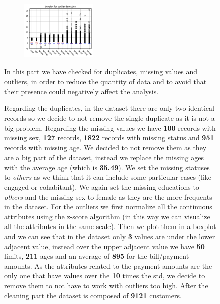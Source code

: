\begin{figure}[h]
  \begin{minipage}[h]{0.95\textwidth}

\begin{figure}
\centering
\includegraphics[width=0.40\textwidth]{img/ch2/outlier}
\end{figure}

    In this part we have checked for duplicates, missing values and outliers, in order to reduce the quantity of data and to avoid that their presence could negatively affect the analysis.

    Regarding the duplicates, in the dataset there are only two identical records so we decide to not remove the single duplicate as it is not a big problem.
    Regarding the missing values we have \textbf{100} records with missing sex, \textbf{127} records, \textbf{1822} records with missing status and \textbf{951} records with missing age. We decided to not remove them as they are a big part of the dataset, instead we replace the missing ages with the average age (which is \textbf{35.49}). We set the missing statuses to \textit{others} as we think that it can include some particular cases (like engaged or cohabitant). We again set the missing educations to \textit{others} and the missing sex to female as they are the more frequents in the dataset. 
    For the outliers we first normalize all the continuous attributes using the z-score algorithm (in this way we can visualize all the attributes in the same scale). Then we plot them in a boxplot and we can see that in the dataset only \textbf{3} values are under the lower adjacent value, instead over the upper adjacent value we have \textbf{50} limits, \textbf{211} ages and an average of \textbf{895} for the bill/payment amounts. As the attributes related to the payment amounts are the only one that have values over the \textbf{10} times the std, we decide to remove them to not have to work with outliers too high. After the cleaning part the dataset is composed of \textbf{9121} customers. 
  \end{minipage}
\end{figure}

